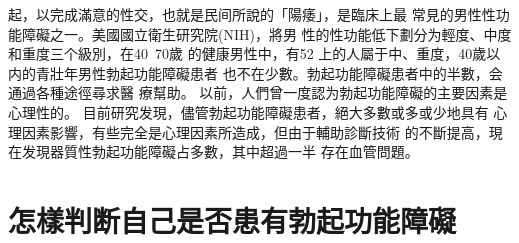 \documentclass[12pt,UTF8]{ctexbook}
\begin{document}
起，以完成滿意的性交，也就是民间所說的「陽痿」，是臨床上最
常見的男性性功能障礙之一。美國國立衛生研究院(NIH)，將男
性的性功能低下劃分为輕度、中度和重度三个級別，在40~70歲
的健康男性中，有52%
上的人屬于中、重度，40歲以内的青壯年男性勃起功能障礙患者
也不在少數。勃起功能障礙患者中的半數，会通過各種途徑尋求醫
療幫助。
以前，人們曾一度認为勃起功能障礙的主要因素是心理性的。
目前研究发現，儘管勃起功能障礙患者，絕大多數或多或少地具有
心理因素影響，有些完全是心理因素所造成，但由于輔助診斷技術
的不斷提高，現在发現器質性勃起功能障礙占多數，其中超過一半
存在血管問題。

\section{怎樣判断自己是否患有勃起功能障礙}
\end{document}
